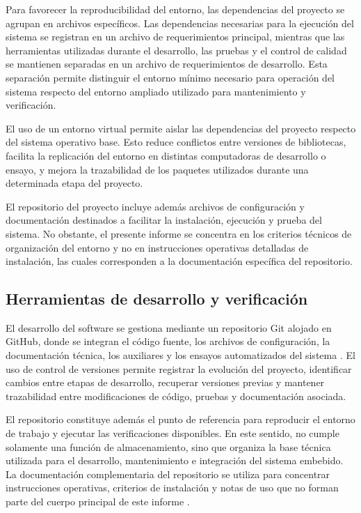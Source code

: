 Para favorecer la reproducibilidad del entorno, las dependencias del proyecto se agrupan en archivos específicos. Las dependencias necesarias para la ejecución del sistema se registran en un archivo de requerimientos principal, mientras que las herramientas utilizadas durante el desarrollo, las pruebas y el control de calidad se mantienen separadas en un archivo de requerimientos de desarrollo. Esta separación permite distinguir el entorno mínimo necesario para operación del sistema respecto del entorno ampliado utilizado para mantenimiento y verificación.

El uso de un entorno virtual permite aislar las dependencias del proyecto respecto del sistema operativo base. Esto reduce conflictos entre versiones de bibliotecas, facilita la replicación del entorno en distintas computadoras de desarrollo o ensayo, y mejora la trazabilidad de los paquetes utilizados durante una determinada etapa del proyecto.

El repositorio del proyecto incluye además archivos de configuración y documentación destinados a facilitar la instalación, ejecución y prueba del sistema. No obstante, el presente informe se concentra en los criterios técnicos de organización del entorno y no en instrucciones operativas detalladas de instalación, las cuales corresponden a la documentación específica del repositorio.

\subsection{Herramientas de desarrollo y verificación}
\label{subsec:herramientas_desarrollo}

El desarrollo del software se gestiona mediante un repositorio Git alojado en GitHub, donde se integran el código fuente, los archivos de configuración, la documentación técnica, los 
 auxiliares y los ensayos automatizados del sistema \citep{BoyaRepo}. El uso de control de versiones permite registrar la evolución del proyecto, identificar cambios entre etapas de desarrollo, recuperar versiones previas y mantener trazabilidad entre modificaciones de código, pruebas y documentación asociada.

El repositorio constituye además el punto de referencia para reproducir el entorno de trabajo y ejecutar las verificaciones disponibles. En este sentido, no cumple solamente una función de almacenamiento, sino que organiza la base técnica utilizada para el desarrollo, mantenimiento e integración del sistema embebido. La documentación complementaria del repositorio se utiliza para concentrar instrucciones operativas, criterios de instalación y notas de uso que no forman parte del cuerpo principal de este informe \citep{BoyaRepoDocs}.

